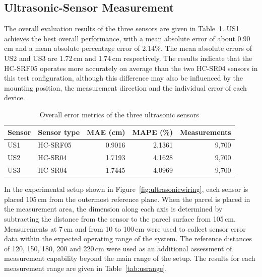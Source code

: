 \subsection{Ultrasonic-Sensor Measurement}

The overall evaluation results of the three sensors are given in Table~\ref{tab:usraw}. US1 achieves the best overall performance, with a mean absolute error of about 0.90\,cm and a mean absolute percentage error of 2.14\%. The mean absolute errors of US2 and US3 are 1.72\,cm and 1.74\,cm respectively. The results indicate that the HC-SRF05 operates more accurately on average than the two HC-SR04 sensors in this test configuration, although this difference may also be influenced by the mounting position, the measurement direction and the individual error of each device.

\begin{table}[htbp]
\centering
\caption{Overall error metrics of the three ultrasonic sensors}
\label{tab:usraw}
\small
\begin{tabular}{llrrr}
\hline
\textbf{Sensor} & \textbf{Sensor type} & \textbf{MAE (cm)} & \textbf{MAPE (\%)} & \textbf{Measurements} \\
\hline
US1 & HC-SRF05 & 0.9016 & 2.1361 & 9,700 \\
US2 & HC-SR04 & 1.7193 & 4.1628 & 9,700 \\
US3 & HC-SR04 & 1.7445 & 4.0969 & 9,700 \\
\hline
\end{tabular}
\end{table}

In the experimental setup shown in Figure~\ref{fig:ultrasonicwiring}, each sensor is placed 105\,cm from the outermost reference plane. When the parcel is placed in the measurement area, the dimension along each axis is determined by subtracting the distance from the sensor to the parcel surface from 105\,cm. Measurements at 7\,cm and from 10 to 100\,cm were used to collect sensor error data within the expected operating range of the system. The reference distances of 120, 150, 180, 200 and 220\,cm were used as an additional assessment of measurement capability beyond the main range of the setup. The results for each measurement range are given in Table~\ref{tab:usrange}.

